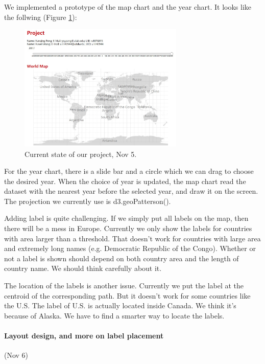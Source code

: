 \documentclass[12pt, fullpage,letterpaper]{article}
\begin{document}
We implemented a prototype of the map chart and the year chart.
It looks like the follwing (Figure \ref{fig:nov5}):

\begin{figure}[h!]
    \begin{center}
        \includegraphics[width=0.7\textwidth]{figs/Nov5.jpg}
        \caption{Current state of our project, Nov 5.}
        \label{fig:nov5}
    \end{center}
\end{figure}

For the year chart, there is a slide bar and a circle which we can drag to choose the desired year.
When the choice of year is updated, the map chart read the dataset with the nearest year before the selected year,
and draw it on the screen. The projection we currently use is d3.geoPatterson().

Adding label is quite challenging. If we simply put all labels on the map,
then there will be a mess in Europe. Currently we only show the labels for countries
with area larger than a threshold. That doesn't work for countries with large area and extremely
long names (e.g. Democratic Republic of the Congo). Whether or not a label is shown
should depend on both country area and the length of country name. We should think carefully about it.

The location of the labels is another issue. Currently we put the label
at the centroid of the corresponding path. But it doesn't work for some countries like the U.S.
The label of U.S. is actually located inside Canada. We think it's because of Alaska.
We have to find a smarter way to locate the labels.

\newpage
\paragraph{Layout design, and more on label placement} (Nov 6)
\end{document}
